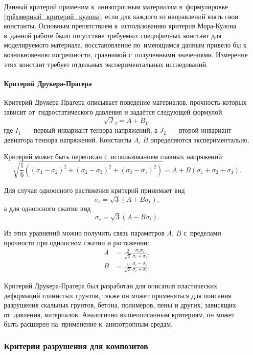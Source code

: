 \documentclass[thesis.tex]{subfiles}
\begin{document}
Данный критерий применим к~анизотропным материалам в~формулировке \eqref{трёхмерный_критерий_кулона}, если для каждого из
направлений взять свои константы. Основным препятствием к~использованию критерия Мора-Кулона в~данной работе было
отсутствие требуемых специфичных констант для моделируемого материала, восстановление по~имеющимся данным привело бы к
возникновению погрешности, сравнимой с~полученными значениями. Измерение этих констант требует отдельных
экспериментальных исследований.

\paragraph{Критерий Друкера-Прагера}
Критерий Друкера-Прагера описывает поведение материалов, прочность которых зависит от~гидростатического давления
\cite{drucker1952soil} и задаётся следующей формулой:
\begin{equation}
    \sqrt J_2 = A + B _1,
\end{equation}
где $I_1$~--- первый инвариант тензора напряжений, а $J_2$~--- второй инвариант девиатора тензора напряжений. Константы
$A$, $B$ определяются экспериментально.

Критерий может быть переписан с~использованием главных напряжений:
\[
    \sqrt{\frac{1}{6}\left( (\sigma_1-\sigma_2)^2+(\sigma_2-\sigma_3)^2+(\sigma_3-\sigma_1)^2 \right)}=
    A+B(\sigma_1+\sigma_2+\sigma_3).
\]

Для случая одноосного растяжения критерий принимает вид
\[
    \sigma_t = \sqrt{3}(A+B\sigma_t),
\]
а для одноосного сжатия вид
\[
    \sigma_c = \sqrt{3}(A-B\sigma_t).
\]

Из этих уравнений можно получить связь параметров $A$, $B$ с~пределами прочности при одноосном сжатии и растяжении:
\begin{align}
    A &= \frac{2}{\sqrt 3}\frac{\sigma_c\sigma_t}{\sigma_c+\sigma_t}, \nonumber \\
    B &= \frac{1}{\sqrt 3}\frac{\sigma_t-\sigma_c}{\sigma_c+\sigma_t}.
\end{align}

Критерий Друкера-Прагера был разработан для описания пластических деформаций глинистых грунтов, также он может
применяться для описания разрушения скальных грунтов, бетона, полимеров, пены и других, зависящих от~давления,
материалов. Аналогично вышеописанным критериям, он может быть расширен на~применение к~анизотропным средам.

\subsubsection{Критерии разрушения для композитов}
\label{раздел:критерии-для-композитов}
\end{document}
